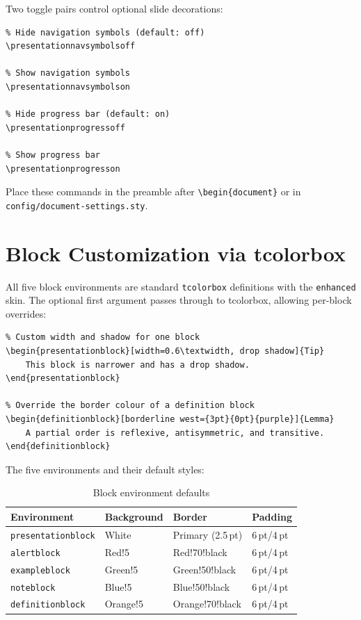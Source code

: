 Two toggle pairs control optional slide decorations:

\begin{verbatim}
% Hide navigation symbols (default: off)
\presentationnavsymbolsoff

% Show navigation symbols
\presentationnavsymbolson

% Hide progress bar (default: on)
\presentationprogressoff

% Show progress bar
\presentationprogresson
\end{verbatim}

Place these commands in the preamble after
\texttt{\textbackslash begin\{document\}} or in
\texttt{config/document-settings.sty}.

\section{Block Customization via tcolorbox}

All five block environments are standard \texttt{tcolorbox} definitions with
the \texttt{enhanced} skin.  The optional first argument passes through to
tcolorbox, allowing per-block overrides:

\begin{verbatim}
% Custom width and shadow for one block
\begin{presentationblock}[width=0.6\textwidth, drop shadow]{Tip}
    This block is narrower and has a drop shadow.
\end{presentationblock}

% Override the border colour of a definition block
\begin{definitionblock}[borderline west={3pt}{0pt}{purple}]{Lemma}
    A partial order is reflexive, antisymmetric, and transitive.
\end{definitionblock}
\end{verbatim}

The five environments and their default styles:

\begin{table}[htbp]
    \centering
    \caption{Block environment defaults}
    \label{tab:block-defaults}
    \begin{tabular}{@{} l l l l @{}}
        \toprule
        \textbf{Environment} & \textbf{Background} & \textbf{Border} & \textbf{Padding} \\
        \midrule
        \texttt{presentationblock} & White        & Primary (2.5\,pt)   & 6\,pt/4\,pt \\
        \texttt{alertblock}        & Red!5        & Red!70!black        & 6\,pt/4\,pt \\
        \texttt{exampleblock}      & Green!5      & Green!50!black      & 6\,pt/4\,pt \\
        \texttt{noteblock}         & Blue!5       & Blue!50!black       & 6\,pt/4\,pt \\
        \texttt{definitionblock}   & Orange!5     & Orange!70!black     & 6\,pt/4\,pt \\
        \bottomrule
    \end{tabular}
\end{table}

